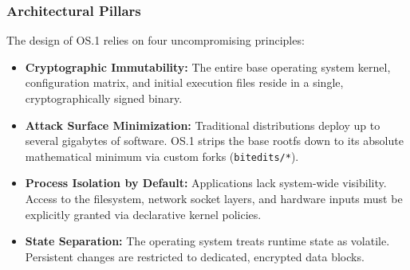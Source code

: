 \documentclass{article}
\begin{document}
\begin{center}
\end{center}

\subsubsection*{Architectural Pillars}
The design of OS.1 relies on four uncompromising principles:
\begin{itemize}
    \item \textbf{Cryptographic Immutability:} The entire base operating system kernel, configuration matrix, and initial execution files reside in a single, cryptographically signed binary.
    \item \textbf{Attack Surface Minimization:} Traditional distributions deploy up to several gigabytes of software. OS.1 strips the base rootfs down to its absolute mathematical minimum via custom forks (\texttt{bitedits/*}).
    \item \textbf{Process Isolation by Default:} Applications lack system-wide visibility. Access to the filesystem, network socket layers, and hardware inputs must be explicitly granted via declarative kernel policies.
    \item \textbf{State Separation:} The operating system treats runtime state as volatile. Persistent changes are restricted to dedicated, encrypted data blocks.
\end{itemize}
\end{document}
